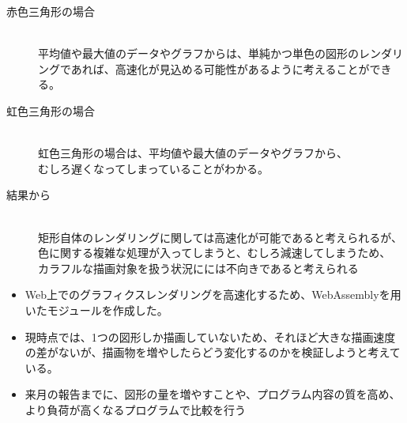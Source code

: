 \begin{description}
\begin{description}
		\item[赤色三角形の場合]~\\
		平均値や最大値のデータやグラフからは、単純かつ単色の図形のレンダリングであれば、高速化が見込める可能性があるように考えることができる。
		\item[虹色三角形の場合]~\\
		虹色三角形の場合は、平均値や最大値のデータやグラフから、\\むしろ遅くなってしまっていることがわかる。
		\item[結果から]~\\
		矩形自体のレンダリングに関しては高速化が可能であると考えられるが、
		色に関する複雑な処理が入ってしまうと、むしろ減速してしまうため、
		カラフルな描画対象を扱う状況にには不向きであると考えられる
	\end{description}

	
\end{description}


\newpage

\label{MUSUBI}
\begin{itemize}
	\item Web上でのグラフィクスレンダリングを高速化するため、WebAssemblyを用いたモジュールを作成した。
	\item 現時点では、1つの図形しか描画していないため、それほど大きな描画速度の差がないが、描画物を増やしたらどう変化するのかを検証しようと考えている。
	\item 来月の報告までに、図形の量を増やすことや、プログラム内容の質を高め、より負荷が高くなるプログラムで比較を行う
\end{itemize}
\newpage

